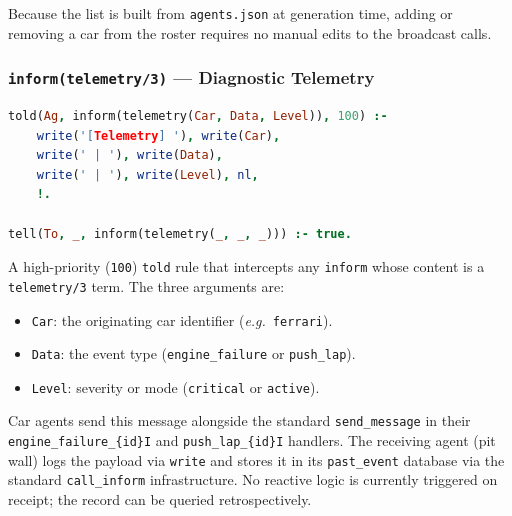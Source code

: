 \noindent
Because the list is built from \texttt{agents.json} at generation time, adding
or removing a car from the roster requires no manual edits to the broadcast
calls.

\subsubsection{\texttt{inform(telemetry/3)} --- Diagnostic Telemetry}

\begin{minipage}{\linewidth}
\begin{lstlisting}[language=Prolog]
told(Ag, inform(telemetry(Car, Data, Level)), 100) :-
    write('[Telemetry] '), write(Car),
    write(' | '), write(Data),
    write(' | '), write(Level), nl,
    !.

tell(To, _, inform(telemetry(_, _, _))) :- true.
\end{lstlisting}
\end{minipage}

\noindent
A high-priority (\texttt{100}) \texttt{told} rule that intercepts any
\texttt{inform} whose content is a \texttt{telemetry/3} term.  The three
arguments are:
\begin{itemize}[leftmargin=2em, itemsep=2pt]
  \item \texttt{Car}: the originating car identifier (\emph{e.g.}\ \texttt{ferrari}).
  \item \texttt{Data}: the event type (\texttt{engine\_failure} or \texttt{push\_lap}).
  \item \texttt{Level}: severity or mode (\texttt{critical} or \texttt{active}).
\end{itemize}

Car agents send this message alongside the standard \texttt{send\_message} in
their \texttt{engine\_failure\_\{id\}I} and \texttt{push\_lap\_\{id\}I}
handlers.  The receiving agent (pit wall) logs the payload via \texttt{write}
and stores it in its \texttt{past\_event} database via the standard
\texttt{call\_inform} infrastructure.  No reactive logic is currently
triggered on receipt; the record can be queried retrospectively.
